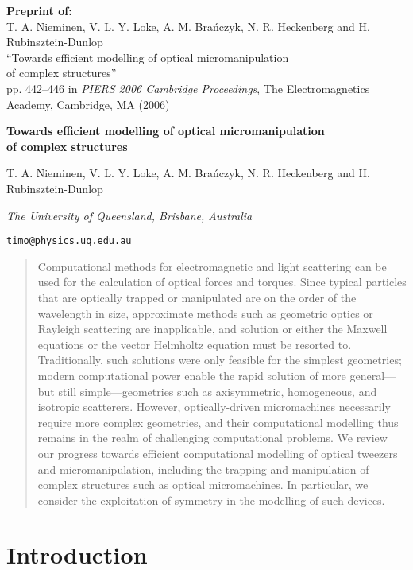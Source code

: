 \documentclass{article}
\begin{document}
\noindent
\textbf{Preprint of:}\\
T. A. Nieminen, V. L. Y. Loke,
A. M. Bra\'{n}czyk,
N. R. Heckenberg and
H. Rubinsztein-Dunlop\\
``Towards efficient modelling of optical micromanipulation\\
of complex structures''\\
pp. 442--446 in
\textit{PIERS 2006 Cambridge Proceedings},
The Electromagnetics Academy, Cambridge, MA (2006)


\hrulefill

\begin{center}

\Large
\textbf{Towards efficient modelling of optical micromanipulation\\
of complex structures}

\normalsize
T. A. Nieminen, V. L. Y. Loke,
A. M. Bra\'{n}czyk,
N. R. Heckenberg and
H. Rubinsztein-Dunlop

\textit{The University of Queensland,
Brisbane, Australia}

\texttt{timo@physics.uq.edu.au}

\end{center}

\begin{abstract}
Computational methods for electromagnetic and light
scattering can be used for the calculation of optical
forces and torques. Since typical particles that are
optically trapped or manipulated are on the order of the
wavelength in size, approximate methods such as geometric
optics or Rayleigh scattering are inapplicable, and solution
or either the Maxwell equations or the vector Helmholtz equation
must be resorted to. Traditionally, such solutions were only
feasible for the simplest geometries; modern computational
power enable the rapid solution of more general---but still
simple---geometries such as axisymmetric, homogeneous, and
isotropic scatterers. However, optically-driven micromachines
necessarily require more complex geometries, and their
computational modelling thus remains in the realm of challenging
computational problems. We review our progress towards efficient
computational modelling of optical tweezers and micromanipulation,
including the trapping and manipulation of complex structures
such as optical micromachines. In particular,
we consider the exploitation of symmetry in the modelling
of such devices.
\end{abstract}

\section{Introduction}
\end{document}
